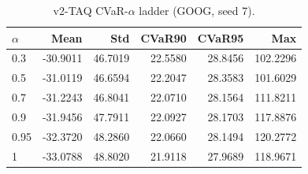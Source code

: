\begin{table}[H]
    \centering
    \caption{v2-TAQ CVaR-$\alpha$ ladder (GOOG, seed 7).}
    \label{tab:v2_taq_alpha}
    \begin{tabular}{@{}lrrrrr@{}}
        \toprule
        $\alpha$ & Mean & Std & CVaR90 & CVaR95 & Max \\
        \midrule
        0.3 & -30.9011 & 46.7019 & 22.5580 & 28.8456 & 102.2296 \\
        0.5 & -31.0119 & 46.6594 & 22.2047 & 28.3583 & 101.6029 \\
        0.7 & -31.2243 & 46.8041 & 22.0710 & 28.1564 & 111.8211 \\
        0.9 & -31.9456 & 47.7911 & 22.0927 & 28.1703 & 117.8876 \\
        0.95 & -32.3720 & 48.2860 & 22.0660 & 28.1494 & 120.2772 \\
        1 & -33.0788 & 48.8020 & 21.9118 & 27.9689 & 118.9671 \\
        \bottomrule
    \end{tabular}
\end{table}
